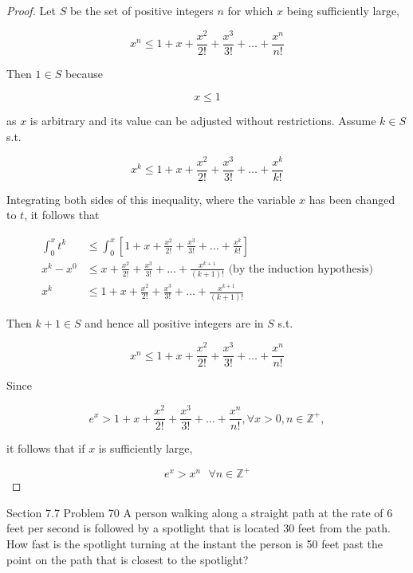 \documentclass{article}
\begin{document}
    \begin{proof}
        Let $S$ be the set of positive integers $n$ for which $x$ being sufficiently large,

        \[
            x^n \leq 1 + x + \frac{x^2}{2!} + \frac{x^3}{3!} + \dots + \frac{x^n}{n!}
        \]

        Then $1\in S$ because

        \[
            x\leq 1
        \]

        as $x$ is arbitrary and its value can be adjusted without restrictions. Assume $k\in S$ s.t.

        \[
            x^k \leq 1 + x + \frac{x^2}{2!} + \frac{x^3}{3!} + \dots + \frac{x^k}{k!}
        \]

        Integrating both sides of this inequality, where the variable $x$ has been changed to $t$, it follows that

        \begin{align*}
        \int_0^x t^k        &\leq \int_0^x \left[1+x+\frac{x^2}{2!} + \frac{x^3}{3!} + \dots + \frac{x^k}{k!}\right] \\
            x^k - x^0       &\leq x + \frac{x^2}{2!} + \frac{x^3}{3!} + \dots + \frac{x^{k+1}}{(k+1)!} \text{ (by the induction hypothesis)} \\
            x^k             &\leq 1 + x + \frac{x^2}{2!} + \frac{x^3}{3!} + \dots + \frac{x^{k+1}}{(k+1)!}
        \end{align*}

        Then $k+1\in S$ and hence all positive integers are in $S$ s.t.

        \[
            x^n \leq 1 + x + \frac{x^2}{2!} + \frac{x^3}{3!} + \dots + \frac{x^n}{n!}
        \]

        Since

        \[
            e^x > 1 + x + \frac{x^2}{2!} + \frac{x^3}{3!} + \dots + \frac{x^n}{n!}, \forall x > 0, n\in \mathbb{Z}^+,
        \]

        it follows that if $x$ is sufficiently large,

        \[
            e^x > x^n \text{ }\forall n\in \mathbb{Z}^+
        \]
    \end{proof}

    \pagebreak
    \thispagestyle{4}

    \begin{tbhtheorem}{Section 7.7 Problem 70}
        A person walking along a straight path at the rate of 6 feet per second is followed by a spotlight that is located 30 feet from the path. How fast is the spotlight turning at the instant the person is 50 feet
        past the point on the path that is closest to the spotlight?
    \end{tbhtheorem}
\end{document}
